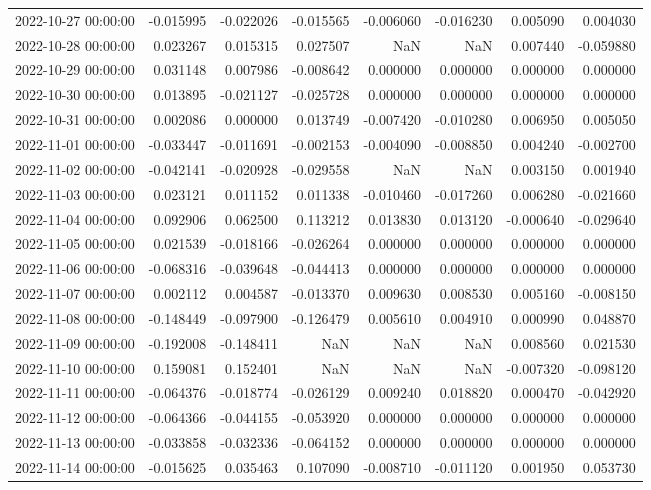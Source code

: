 \begin{tabular}{lrrrrrrr}
2022-10-27 00:00:00 & -0.015995 & -0.022026 & -0.015565 & -0.006060 & -0.016230 & 0.005090 & 0.004030 \\
2022-10-28 00:00:00 & 0.023267 & 0.015315 & 0.027507 & NaN & NaN & 0.007440 & -0.059880 \\
2022-10-29 00:00:00 & 0.031148 & 0.007986 & -0.008642 & 0.000000 & 0.000000 & 0.000000 & 0.000000 \\
2022-10-30 00:00:00 & 0.013895 & -0.021127 & -0.025728 & 0.000000 & 0.000000 & 0.000000 & 0.000000 \\
2022-10-31 00:00:00 & 0.002086 & 0.000000 & 0.013749 & -0.007420 & -0.010280 & 0.006950 & 0.005050 \\
2022-11-01 00:00:00 & -0.033447 & -0.011691 & -0.002153 & -0.004090 & -0.008850 & 0.004240 & -0.002700 \\
2022-11-02 00:00:00 & -0.042141 & -0.020928 & -0.029558 & NaN & NaN & 0.003150 & 0.001940 \\
2022-11-03 00:00:00 & 0.023121 & 0.011152 & 0.011338 & -0.010460 & -0.017260 & 0.006280 & -0.021660 \\
2022-11-04 00:00:00 & 0.092906 & 0.062500 & 0.113212 & 0.013830 & 0.013120 & -0.000640 & -0.029640 \\
2022-11-05 00:00:00 & 0.021539 & -0.018166 & -0.026264 & 0.000000 & 0.000000 & 0.000000 & 0.000000 \\
2022-11-06 00:00:00 & -0.068316 & -0.039648 & -0.044413 & 0.000000 & 0.000000 & 0.000000 & 0.000000 \\
2022-11-07 00:00:00 & 0.002112 & 0.004587 & -0.013370 & 0.009630 & 0.008530 & 0.005160 & -0.008150 \\
2022-11-08 00:00:00 & -0.148449 & -0.097900 & -0.126479 & 0.005610 & 0.004910 & 0.000990 & 0.048870 \\
2022-11-09 00:00:00 & -0.192008 & -0.148411 & NaN & NaN & NaN & 0.008560 & 0.021530 \\
2022-11-10 00:00:00 & 0.159081 & 0.152401 & NaN & NaN & NaN & -0.007320 & -0.098120 \\
2022-11-11 00:00:00 & -0.064376 & -0.018774 & -0.026129 & 0.009240 & 0.018820 & 0.000470 & -0.042920 \\
2022-11-12 00:00:00 & -0.064366 & -0.044155 & -0.053920 & 0.000000 & 0.000000 & 0.000000 & 0.000000 \\
2022-11-13 00:00:00 & -0.033858 & -0.032336 & -0.064152 & 0.000000 & 0.000000 & 0.000000 & 0.000000 \\
2022-11-14 00:00:00 & -0.015625 & 0.035463 & 0.107090 & -0.008710 & -0.011120 & 0.001950 & 0.053730 \\

\end{tabular}
